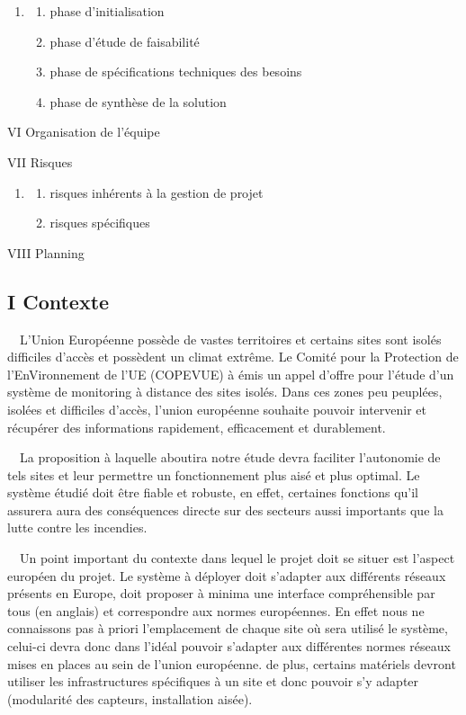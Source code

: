\documentclass{article}
\begin{document}
\begin{enumerate}
\item \begin{enumerate}
\item phase d’initialisation
\item phase d’étude de faisabilité
\item phase de spécifications techniques des besoins
\item phase de synthèse de la solution
\end{enumerate}
\end{enumerate}
VI Organisation de l’équipe

VII Risques

\begin{enumerate}
\item \begin{enumerate}
\item risques inhérents à la gestion de projet
\item risques spécifiques
\end{enumerate}
\end{enumerate}
VIII Planning

\subsection[I Contexte]{I Contexte}
\ \ L’Union Européenne possède de vastes territoires et certains sites
sont isolés difficiles d’accès et possèdent un climat extrême. Le
Comité pour la Protection de l’EnVironnement de l’UE (COPEVUE) à émis
un appel d’offre pour l’étude d’un système de monitoring à distance des
sites isolés. Dans ces zones peu peuplées, isolées et difficiles
d’accès, l’union européenne souhaite pouvoir intervenir et récupérer
des informations rapidement, efficacement et durablement.

\ \ La proposition à laquelle aboutira notre étude devra faciliter
l’autonomie de tels sites et leur permettre un fonctionnement plus aisé
et plus optimal. Le système étudié doit être fiable et robuste, en
effet, certaines fonctions qu’il assurera aura des conséquences directe
sur des secteurs aussi importants que la lutte contre les incendies.

\ \ Un point important du contexte dans lequel le projet doit se situer
est l’aspect européen du projet. Le système à déployer doit s’adapter
aux différents réseaux présents en Europe, doit proposer à minima une
interface compréhensible par tous (en anglais)  et correspondre aux
normes européennes. En effet nous ne connaissons pas à priori
l’emplacement de chaque site où sera utilisé le système, celui-ci devra
donc dans l’idéal pouvoir s’adapter aux différentes normes réseaux
mises en places au sein de l’union européenne. de plus, certains
matériels devront utiliser les infrastructures spécifiques à un site et
donc pouvoir s’y adapter (modularité des capteurs, installation aisée).
\end{document}
